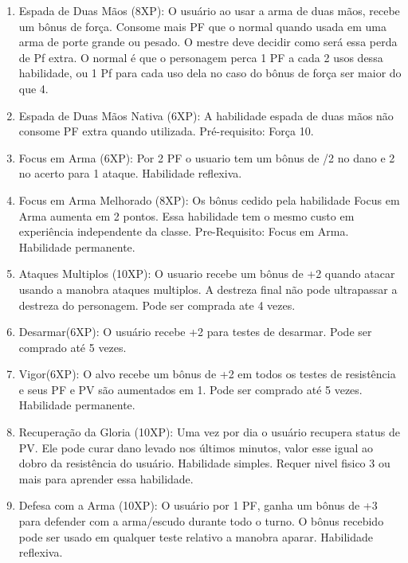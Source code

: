 \begin{enumerate}
	\item Espada de Duas Mãos (8XP): O usuário ao usar a arma de duas mãos, recebe um bônus de força. Consome mais PF que o normal quando usada em uma arma de porte grande ou pesado. O mestre deve decidir como será essa perda de Pf extra. O normal é que o personagem perca 1 PF a cada 2 usos dessa habilidade, ou 1 Pf para cada uso dela no caso do bônus de força ser maior do que 4.
	
		\item Espada de Duas Mãos Nativa (6XP): A habilidade espada de duas mãos não consome PF extra quando utilizada. Pré-requisito: Força 10. 

	\item Focus em Arma (6XP): Por 2 PF o usuario tem um bônus de /2 no dano e 2 no acerto para 1 ataque. Habilidade reflexiva.

	\item Focus em Arma Melhorado (8XP): Os bônus cedido pela habilidade Focus em Arma aumenta em 2 pontos. Essa habilidade tem o mesmo custo em experiência independente da classe. Pre-Requisito: Focus em Arma. Habilidade permanente.

	\item Ataques Multiplos (10XP): O usuario recebe um bônus de +2 quando atacar usando a manobra ataques multiplos. A destreza final não pode ultrapassar a destreza do personagem. Pode ser comprada ate 4 vezes. 

	\item Desarmar(6XP): O usuário recebe +2 para testes de desarmar. Pode ser comprado até 5 vezes.

	\item Vigor(6XP): O alvo recebe um bônus de +2 em todos os testes de resistência e seus PF e PV são aumentados em 1. Pode ser comprado até 5 vezes. Habilidade permanente.

	\item Recuperação da Gloria (10XP): Uma vez por dia o usuário recupera status de PV. Ele pode curar dano levado nos últimos minutos, valor esse igual ao dobro da resistência do usuário. Habilidade simples. Requer nivel fisico 3 ou mais para aprender essa habilidade.

	\item Defesa com a Arma (10XP): O usuário por 1 PF, ganha um bônus de +3 para defender com a arma/escudo durante todo o turno. O bônus recebido pode ser usado em qualquer teste relativo a manobra aparar. Habilidade reflexiva.
	

\end{enumerate}
